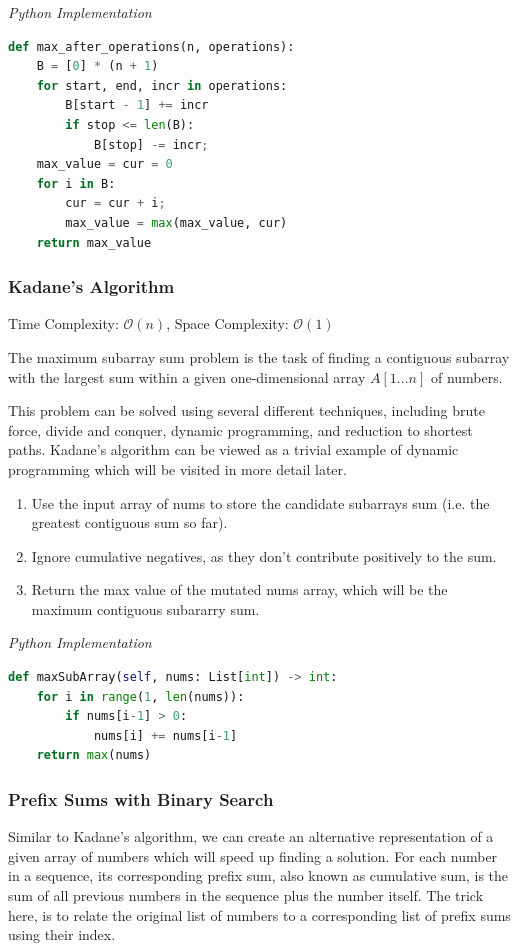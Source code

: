 \documentclass{article}
\newcommand{\bigO}{\mathcal{O}}
\begin{document}
\vspace{8pt} \emph{Python Implementation}
\begin{lstlisting}[language=Python]
def max_after_operations(n, operations):
    B = [0] * (n + 1)
    for start, end, incr in operations:
        B[start - 1] += incr
        if stop <= len(B):
            B[stop] -= incr;
    max_value = cur = 0
    for i in B:
        cur = cur + i;
        max_value = max(max_value, cur)
    return max_value
\end{lstlisting}

    \subsubsection{Kadane's Algorithm}
    Time Complexity: $\bigO(n)$, Space Complexity: $\bigO(1)$
    
    The maximum subarray sum problem is the task of finding a contiguous subarray with the largest sum within a given one-dimensional array $A[1...n]$ of numbers.
    
    This problem can be solved using several different techniques, including brute force, divide and conquer, dynamic programming, and reduction to shortest paths. Kadane's algorithm can be viewed as a trivial example of dynamic programming which will be visited in more detail later.
    
    \begin{enumerate}
        \item Use the input array of nums to store the candidate subarrays sum (i.e. the greatest contiguous sum so far).
        \item Ignore cumulative negatives, as they don't contribute positively to the sum.
        \item Return the max value of the mutated nums array, which will be the maximum contiguous subararry sum.
    \end{enumerate} 
    
\vspace{8pt} \emph{Python Implementation}
\begin{lstlisting}[language=Python]
def maxSubArray(self, nums: List[int]) -> int:
    for i in range(1, len(nums)):
        if nums[i-1] > 0:
            nums[i] += nums[i-1]
    return max(nums)
\end{lstlisting}

    \subsubsection{Prefix Sums with Binary Search}
    Similar to Kadane's algorithm, we can create an alternative representation of a given array of numbers which will speed up finding a solution. For each number in a sequence, its corresponding prefix sum, also known as cumulative sum, is the sum of all previous numbers in the sequence plus the number itself. The trick here, is to relate the original list of numbers to a corresponding list of prefix sums using their index.
    
\end{document}
